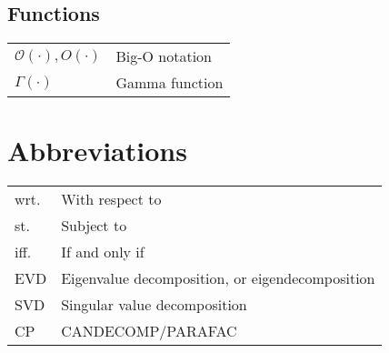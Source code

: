 \documentclass{article}
\begin{document}
\subsection{Functions}
\begin{xltabular}{\textwidth}{XX}
    \(\mathcal{O}(\cdot), O(\cdot)\) & Big-O notation\\
    \(\Gamma(\cdot)\) & Gamma function\\
\end{xltabular}

\section{Abbreviations}
\begin{xltabular}{\textwidth}{XX}
    wrt. & With respect to\\
    st. & Subject to\\
    iff. & If and only if\\
    EVD & Eigenvalue decomposition, or eigendecomposition \cite{nossekAdaptiveArraySignal2015}\\
    SVD & Singular value decomposition\\
    CP & CANDECOMP/PARAFAC\\
\end{xltabular}

\printbibliography
\end{document}
